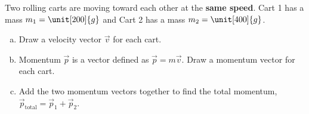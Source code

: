 \label{fnt6.1.2-7}

Two rolling carts are moving toward each other at the \textbf{same speed}.  Cart 1 has a mass $m_1 = \unit[200]{g}$ and Cart 2 has a mass $m_2 = \unit[400]{g}$.

\begin{enumerate}[(a)]
	\item Draw a velocity vector $\vec{v}$ for each cart.
	
	\item Momentum $\vec{p}$ is a vector defined as $\vec{p} = m\vec{v}$.  Draw a momentum vector for each cart.
	
	\item Add the two momentum vectors together to find the total momentum, $\vec{p}_\text{total} = \vec{p}_1 + \vec{p}_2$.
\end{enumerate}